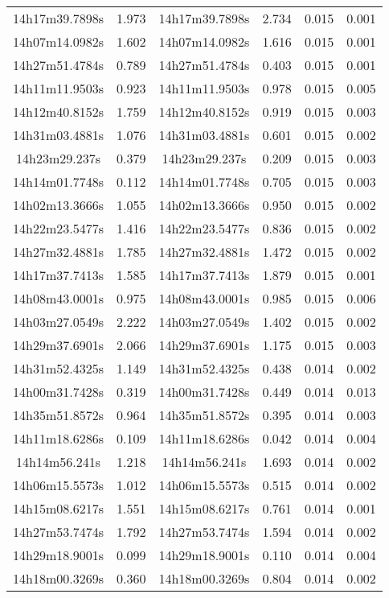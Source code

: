 \begin{table}
\begin{tabular}{cccccc}
14h17m39.7898s & 1.973 & 14h17m39.7898s & 2.734 & 0.015 & 0.001 \\
14h07m14.0982s & 1.602 & 14h07m14.0982s & 1.616 & 0.015 & 0.001 \\
14h27m51.4784s & 0.789 & 14h27m51.4784s & 0.403 & 0.015 & 0.001 \\
14h11m11.9503s & 0.923 & 14h11m11.9503s & 0.978 & 0.015 & 0.005 \\
14h12m40.8152s & 1.759 & 14h12m40.8152s & 0.919 & 0.015 & 0.003 \\
14h31m03.4881s & 1.076 & 14h31m03.4881s & 0.601 & 0.015 & 0.002 \\
14h23m29.237s & 0.379 & 14h23m29.237s & 0.209 & 0.015 & 0.003 \\
14h14m01.7748s & 0.112 & 14h14m01.7748s & 0.705 & 0.015 & 0.003 \\
14h02m13.3666s & 1.055 & 14h02m13.3666s & 0.950 & 0.015 & 0.002 \\
14h22m23.5477s & 1.416 & 14h22m23.5477s & 0.836 & 0.015 & 0.002 \\
14h27m32.4881s & 1.785 & 14h27m32.4881s & 1.472 & 0.015 & 0.002 \\
14h17m37.7413s & 1.585 & 14h17m37.7413s & 1.879 & 0.015 & 0.001 \\
14h08m43.0001s & 0.975 & 14h08m43.0001s & 0.985 & 0.015 & 0.006 \\
14h03m27.0549s & 2.222 & 14h03m27.0549s & 1.402 & 0.015 & 0.002 \\
14h29m37.6901s & 2.066 & 14h29m37.6901s & 1.175 & 0.015 & 0.003 \\
14h31m52.4325s & 1.149 & 14h31m52.4325s & 0.438 & 0.014 & 0.002 \\
14h00m31.7428s & 0.319 & 14h00m31.7428s & 0.449 & 0.014 & 0.013 \\
14h35m51.8572s & 0.964 & 14h35m51.8572s & 0.395 & 0.014 & 0.003 \\
14h11m18.6286s & 0.109 & 14h11m18.6286s & 0.042 & 0.014 & 0.004 \\
14h14m56.241s & 1.218 & 14h14m56.241s & 1.693 & 0.014 & 0.002 \\
14h06m15.5573s & 1.012 & 14h06m15.5573s & 0.515 & 0.014 & 0.002 \\
14h15m08.6217s & 1.551 & 14h15m08.6217s & 0.761 & 0.014 & 0.001 \\
14h27m53.7474s & 1.792 & 14h27m53.7474s & 1.594 & 0.014 & 0.002 \\
14h29m18.9001s & 0.099 & 14h29m18.9001s & 0.110 & 0.014 & 0.004 \\
14h18m00.3269s & 0.360 & 14h18m00.3269s & 0.804 & 0.014 & 0.002 \\

\end{tabular}
\end{table}
